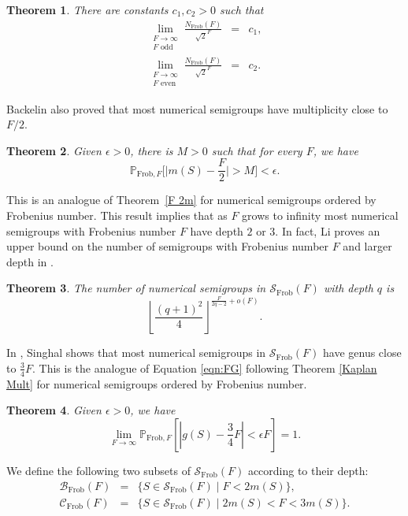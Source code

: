 \documentclass[12pt]{amsart}
\def\S{{\mathcal S}}
\def\B{{\mathcal B}}
\renewcommand{\P}{\mathbb{P}}
\newcommand{\cC}{\mathcal{C}}
\def\SS{{\mathcal S}}
\newcommand{\Frob}{\text{Frob}}
\newtheorem{theorem}{Theorem}
\begin{document}
\begin{theorem}\cite[Proposition 1]{backelin1990number}
There are constants $c_1, c_2 > 0$ such that
\begin{eqnarray*}
\lim_{\substack{F \rightarrow\infty \\ F \text{ odd}}} \frac{N_{\Frob}(F)}{\sqrt{2}^F} & = & c_1,\\
\lim_{\substack{F \rightarrow\infty \\ F \text{ even}}} \frac{N_{\Frob}(F)}{\sqrt{2}^F} & = & c_2.
\end{eqnarray*}
\end{theorem}

Backelin also proved that most numerical semigroups have multiplicity close to $F/2$.
\begin{theorem}\cite[Proposition 2]{backelin1990number}\label{thm: backelin m=F/2}
Given $\epsilon>0$, there is $M>0$ such that for every $F$, we have
\[\P_{\Frob,F}\Big[\Big|m(S)-\frac{F}{2}\Big|>M\Big]<\epsilon.\]
\end{theorem}
This is an analogue of Theorem~\ref{F 2m} for numerical semigroups ordered by Frobenius number.
This result implies that as $F$ grows to infinity most numerical semigroups with Frobenius number $F$ have depth $2$ or $3$.
In fact, Li proves an upper bound on the number of semigroups with Frobenius number $F$ and larger depth in \cite{li2023counting}.
\begin{theorem}\cite[Corollary 1.4]{li2023counting}
The number of numerical semigroups in $\S_{\Frob}(F)$ with depth $q$ is 
\[
\left\lfloor\frac{(q+1)^2}{4}\right\rfloor^{\frac{F}{2q-2} +o(F)}.
\]
\end{theorem}

In \cite{singhal2022distribution}, Singhal shows that most numerical semigroups in $\S_{\Frob}(F)$ have genus close to $\frac{3}{4}F$.  This is the analogue of Equation \eqref{eqn:FG} following Theorem \ref{Kaplan Mult} for numerical semigroups ordered by Frobenius number.

\begin{theorem}\cite[Theorem 3]{singhal2022distribution}\label{thm: singhal genus by frob}
Given $\epsilon>0$, we have
\[
\lim_{F\to\infty} \P_{\Frob,F}\left[\left|g(S)-\frac{3}{4}F\right|<\epsilon F \right]=1.
\]
\end{theorem}

We define the following two subsets of $\SS_{\Frob}(F)$ according to their depth:
\begin{eqnarray*}
\B_{\Frob}(F) & = & \{S\in\SS_{\Frob}(F) \mid F<2m(S)\},\\
\cC_{\Frob}(F)& = & \{S\in\SS_{\Frob}(F)\mid 2m(S)<F<3m(S)\}.
\end{eqnarray*}
\end{document}
